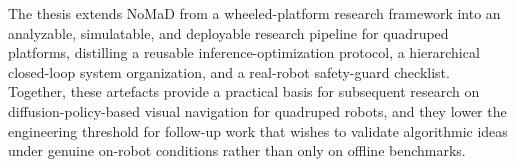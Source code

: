 \begin{digest}[en]
The thesis extends NoMaD from a wheeled-platform research framework into an
analyzable, simulatable, and deployable research pipeline for quadruped platforms,
distilling a reusable inference-optimization protocol, a hierarchical closed-loop
system organization, and a real-robot safety-guard checklist. Together, these
artefacts provide a practical basis for subsequent research on diffusion-policy-based
visual navigation for quadruped robots, and they lower the engineering threshold for
follow-up work that wishes to validate algorithmic ideas under genuine on-robot
conditions rather than only on offline benchmarks.

\end{digest}
